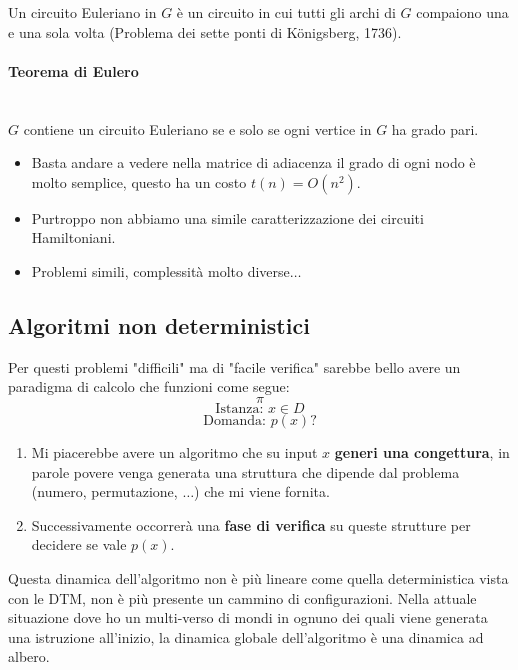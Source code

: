 \documentclass{article}
\begin{document}
Un circuito Euleriano in $G$ è un circuito in cui tutti gli archi di $G$ compaiono una e una
sola volta (Problema dei sette ponti di Königsberg, 1736).
\paragraph{Teorema di Eulero}\mbox{}\\
$G$ contiene un circuito Euleriano se e solo se ogni vertice in $G$ ha grado pari.

\begin{itemize}
    \item Basta andare a vedere nella matrice di adiacenza il grado di ogni nodo è
    molto semplice, questo ha un costo $t(n)=O(n^2)$.
    \item Purtroppo non abbiamo una simile caratterizzazione dei circuiti Hamiltoniani.
    \item Problemi simili, complessità molto diverse$\dots$
\end{itemize}

\subsection{Algoritmi non deterministici}
Per questi problemi "difficili" ma di "facile verifica" sarebbe bello avere un paradigma di
calcolo che funzioni come segue:
$$\pi$$
$$\text{Istanza: }x\in D$$
$$\text{Domanda: }p(x)?$$


\begin{enumerate}
    \item Mi piacerebbe avere un algoritmo che su input $x$ \textbf{generi una congettura}, in parole
        povere venga generata una struttura che dipende dal problema (numero, permutazione, $\dots$)
        che mi viene fornita.

    \item Successivamente occorrerà una \textbf{fase di verifica} su queste strutture per decidere se
    vale $p(x)$.
\end{enumerate}
Questa dinamica dell'algoritmo non è più lineare come quella deterministica vista
con le DTM, non è più presente un cammino di configurazioni. Nella attuale situazione
dove ho un multi-verso di mondi in ognuno dei quali viene generata una istruzione
all'inizio, la dinamica globale dell'algoritmo è una dinamica ad albero.
\end{document}
